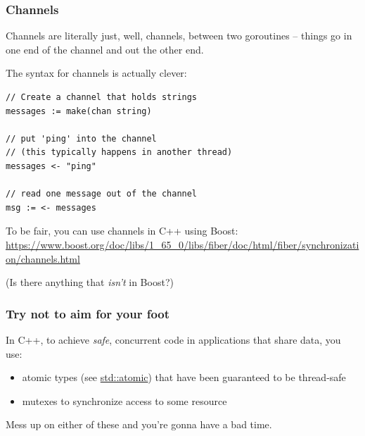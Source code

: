 \documentclass{beamer}
\begin{document}
\begin{frame}[fragile]
\frametitle{Channels}

Channels are literally just, well, channels, between two goroutines -- things go in one end of the channel and out the other end.

The syntax for channels is actually clever:

\begin{lstlisting}
// Create a channel that holds strings
messages := make(chan string)

// put 'ping' into the channel 
// (this typically happens in another thread)
messages <- "ping"

// read one message out of the channel
msg := <- messages
\end{lstlisting}

To be fair, you can use channels in C++ using Boost: \url{https://www.boost.org/doc/libs/1_65_0/libs/fiber/doc/html/fiber/synchronization/channels.html}

\vspace{0.5cm}

(Is there anything that \textit{isn't} in Boost?)
\end{frame}

\begin{frame}
\frametitle{Try not to aim for your foot}

In C++, to achieve \textit{safe}, concurrent code in applications that share data, you use:

\begin{itemize}
\item atomic types (see \href{https://en.cppreference.com/w/cpp/atomic/atomic}{std::atomic}) that have been guaranteed to be thread-safe
\item mutexes to synchronize access to some resource
\end{itemize}

Mess up on either of these and you're gonna have a bad time.

\end{frame}
\end{document}

